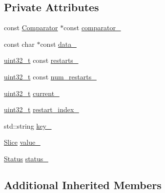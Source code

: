 \subsection*{Private Attributes}
\begin{DoxyCompactItemize}
\item 
const \hyperlink{structleveldb_1_1_comparator}{Comparator} $\ast$const \hyperlink{classleveldb_1_1_block_1_1_iter_a8d6a7b92f8871936961f03339f4f0599}{comparator\-\_\-}
\item 
const char $\ast$const \hyperlink{classleveldb_1_1_block_1_1_iter_a1c59db8f5db56e150aa59c43d8cb1976}{data\-\_\-}
\item 
\hyperlink{stdint_8h_a435d1572bf3f880d55459d9805097f62}{uint32\-\_\-t} const \hyperlink{classleveldb_1_1_block_1_1_iter_a29cd82a678d189009044c54c3e22ba24}{restarts\-\_\-}
\item 
\hyperlink{stdint_8h_a435d1572bf3f880d55459d9805097f62}{uint32\-\_\-t} const \hyperlink{classleveldb_1_1_block_1_1_iter_ac1ec61eae6825859a73d23302875fe11}{num\-\_\-restarts\-\_\-}
\item 
\hyperlink{stdint_8h_a435d1572bf3f880d55459d9805097f62}{uint32\-\_\-t} \hyperlink{classleveldb_1_1_block_1_1_iter_a138761b9a17e914cb938458231ea6420}{current\-\_\-}
\item 
\hyperlink{stdint_8h_a435d1572bf3f880d55459d9805097f62}{uint32\-\_\-t} \hyperlink{classleveldb_1_1_block_1_1_iter_aa4b7cc02f507cb8c6661a69a885e6e77}{restart\-\_\-index\-\_\-}
\item 
std\-::string \hyperlink{classleveldb_1_1_block_1_1_iter_a81757de8bc5414ccfe859e7387bee406}{key\-\_\-}
\item 
\hyperlink{classleveldb_1_1_slice}{Slice} \hyperlink{classleveldb_1_1_block_1_1_iter_a5af74baeadb7f39bb6fa5da621fe04e0}{value\-\_\-}
\item 
\hyperlink{classleveldb_1_1_status}{Status} \hyperlink{classleveldb_1_1_block_1_1_iter_a66460e3f29991e34d6435d2e13edd920}{status\-\_\-}
\end{DoxyCompactItemize}
\subsection*{Additional Inherited Members}


